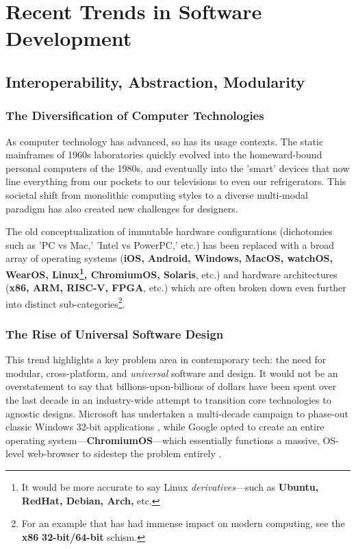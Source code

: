 \documentclass{report}
\newcommand{\tech}[1]{\textbf{#1}}
\begin{document}
\section{Recent Trends in Software Development}
\subsection{Interoperability, Abstraction, Modularity}

\subsubsection{The Diversification of Computer Technologies}
As computer technology has advanced, so has its usage contexts. The static mainframes of 1960s laboratories quickly evolved into the homeward-bound personal computers of the 1980s, and eventually into the 'smart' devices that now line everything from our pockets to our televisions to even our refrigerators. This societal shift from monolithic computing styles to a diverse multi-modal paradigm has also created new challenges for designers. 

The old conceptualization of immutable hardware configurations (dichotomies such as 'PC vs Mac,' 'Intel vs PowerPC,' etc.) has been replaced with a broad array of operating systems (\tech{iOS, Android, Windows, MacOS, watchOS, WearOS, Linux\footnote{It would be more accurate to say Linux \emph{derivatives}---such as \tech{Ubuntu, RedHat, Debian, Arch,} etc.}, ChromiumOS, Solaris}, etc.) and hardware architectures (\tech{x86, ARM, RISC-V, FPGA}, etc.) which are often broken down even further into distinct sub-categories\footnote{For an example that has had immense impact on modern computing, see the \tech{x86} \tech{32-bit/64-bit} schism.}.


\subsubsection{The Rise of Universal Software Design}

This trend highlights a key problem area in contemporary tech: the need for modular, cross-platform, and \emph{universal} software and design. It would not be an overstatement to say that billions-upon-billions of dollars have been spent over the last decade in an industry-wide attempt to transition core technologies to agnostic designs. Microsoft has undertaken a multi-decade campaign to phase-out classic Windows 32-bit applications \cite{Foley_2020}, while Google opted to create an entire operating system---\tech{ChromiumOS}---which essentially functions a massive, OS-level web-browser to sidestep the problem entirely \cite{chrome}. 
\end{document}

